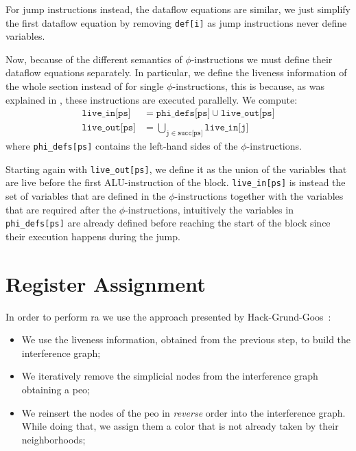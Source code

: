 For jump instructions instead, the dataflow equations are similar, we just simplify the first dataflow equation by removing \texttt{def[i]} as jump instructions never define variables.

Now, because of the different semantics of $\phi$-instructions we must define their dataflow equations separately. In particular, we define the liveness information of the whole section instead of for single $\phi$-instructions, this is because, as was explained in , these instructions are executed parallelly.
We compute:
\begin{align*}
  \texttt{live\_in[ps]} &= \texttt{phi\_defs[ps]} \cup \texttt{live\_out[ps]} \\
  \texttt{live\_out[ps]} &= \bigcup \limits_{\texttt j \in \texttt{succ[ps]}} \texttt{live\_in[j]}
\end{align*}
where \texttt{phi\_defs[ps]} contains the left-hand sides of the $\phi$-instructions.

Starting again with \texttt{live\_out[ps]}, we define it as the union of the variables that are live before the first ALU-instruction of the block. \texttt{live\_in[ps]} is instead the set of variables that are defined in the $\phi$-instructions together with the variables that are required after the $\phi$-instructions, intuitively the variables in \texttt{phi\_defs[ps]} are already defined before reaching the start of the block since their execution happens during the jump.

\section{Register Assignment}
\label{sec:ra}


In order to perform \gls{ra} we use the approach presented by Hack-Grund-Goos~\cite{HGG:2006:RA-SSA}:
\begin{itemize}
  \item We use the liveness information, obtained from the previous step, to build the interference graph;
  \item We iteratively remove the simplicial nodes from the interference graph obtaining a \gls{peo};
  \item We reinsert the nodes of the \gls{peo} in \textit{reverse} order into the interference graph. While doing that, we assign them a color that is not already taken by their neighborhoods;
\end{itemize}

